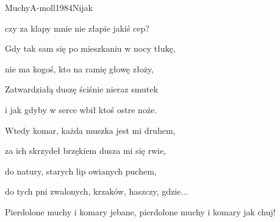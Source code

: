 \begin{song}{Muchy}{A-moll}{1984}{Nijak}{}{}
\begin{SBVerse}
	czy za klapy mnie nie złapie jakiś cep?
	\end{SBVerse}
	\begin{SBVerse}
	Gdy tak sam się po mieszkaniu w nocy tłukę,

	nie ma kogoś, kto na ramię głowę złoży,

	Zatwardziałą duszę ściśnie nieraz smutek

	i jak gdyby w serce wbił ktoś ostre noże.
	\end{SBVerse}
	\begin{SBVerse}
	Wtedy komar, każda muszka jest mi druhem,

	za ich skrzydeł brzękiem dusza mi się rwie,

	do natury, starych lip owianych puchem,

	do tych pni zwalonych, krzaków, haszczy, gdzie...
	\end{SBVerse}

	\begin{SBChorus}
	Pierdolone muchy i komary jebane, pierdolone muchy i komary jak chuj!
	\end{SBChorus}
\end{song}
